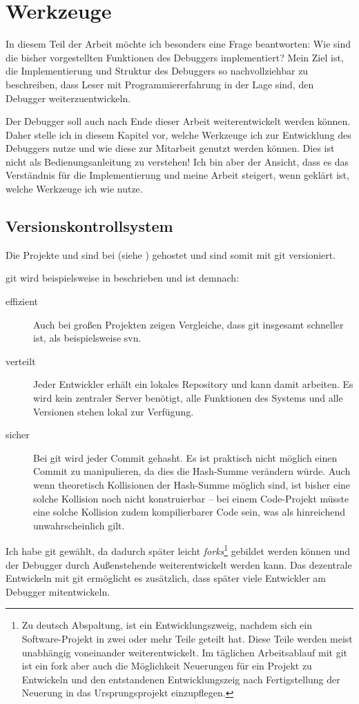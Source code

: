 \chapter{Werkzeuge}
In diesem Teil der Arbeit möchte ich besonders eine Frage beantworten: Wie sind die bisher vorgestellten Funktionen des Debuggers implementiert? Mein Ziel ist, die Implementierung und Struktur des Debuggers so nachvollziehbar zu beschreiben, dass Leser mit Programmiererfahrung in der Lage sind, den Debugger weiterzuentwickeln.

Der Debugger soll auch nach Ende dieser Arbeit weiterentwickelt werden können. Daher stelle ich in diesem Kapitel vor, welche Werkzeuge ich zur Entwicklung des Debuggers nutze und wie diese zur Mitarbeit genutzt werden können. Dies ist nicht als Bedienungsanleitung zu verstehen! Ich bin aber der Ansicht, dass es das Verständnis für die Implementierung und meine Arbeit steigert, wenn geklärt ist, welche Werkzeuge ich wie nutze.

\section{Versionskontrollsystem}
Die Projekte \md und \mdg sind bei  (siehe \cite{Roesch2012,Roesch2012gui}) gehostet und sind somit mit \gls{git} versioniert.

\gls{git} wird beispielsweise in \cite{Ohne1} beschrieben und ist demnach:
\begin{description}
\item[effizient] Auch bei großen Projekten zeigen Vergleiche, dass \gls{git} insgesamt schneller ist, als beispielsweise \gls{svn}.
\item[verteilt] Jeder Entwickler erhält ein lokales Repository und kann damit arbeiten. Es wird kein zentraler Server benötigt, alle Funktionen des Systems und alle Versionen stehen lokal zur Verfügung.
\item[sicher] Bei \gls{git} wird jeder Commit gehasht. Es ist praktisch nicht möglich einen Commit zu manipulieren, da dies die Hash-Summe verändern würde. Auch wenn theoretisch Kollisionen der Hash-Summe möglich sind, ist bisher eine solche Kollision noch nicht konstruierbar -- bei einem Code-Projekt müsste eine solche Kollision zudem kompilierbarer Code sein, was als hinreichend unwahrscheinlich gilt.
\end{description}

Ich habe \gls{git} gewählt, da dadurch später leicht \emph{forks}\footnote{Zu deutsch Abspaltung, ist ein Entwicklungszweig, nachdem sich ein Software-Projekt in zwei oder mehr Teile geteilt hat. Diese Teile werden meist unabhängig voneinander weiterentwickelt. Im täglichen Arbeitsablauf mit \gls{git} ist ein fork aber auch die Möglichkeit Neuerungen für ein Projekt zu Entwickeln und den entstandenen Entwicklungszeig nach Fertigstellung der Neuerung in das Ursprungsprojekt einzupflegen.} gebildet werden können und der Debugger durch Außenstehende weiterentwickelt werden kann. Das dezentrale Entwickeln mit \gls{git} ermöglicht es zusätzlich, dass später viele Entwickler am Debugger mitentwickeln.

